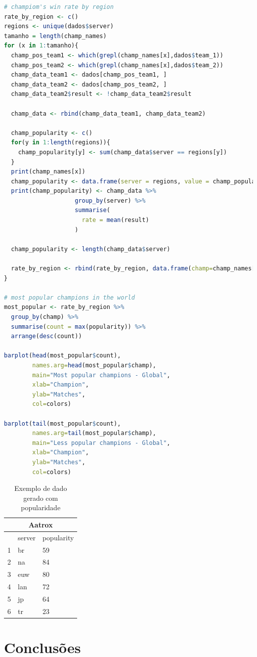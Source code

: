 \documentclass[a4paper]{article}
\begin{document}
\begin{lstlisting}[language=R, caption={Organizando dados com os nomes dos personagens},label={cod:mostpop}]
# champiom's win rate by region
rate_by_region <- c()
regions <- unique(dados$server)
tamanho = length(champ_names)
for (x in 1:tamanho){
  champ_pos_team1 <- which(grepl(champ_names[x],dados$team_1))
  champ_pos_team2 <- which(grepl(champ_names[x],dados$team_2))
  champ_data_team1 <- dados[champ_pos_team1, ]
  champ_data_team2 <- dados[champ_pos_team2, ]
  champ_data_team2$result <- !champ_data_team2$result
  
  champ_data <- rbind(champ_data_team1, champ_data_team2)
  
  champ_popularity <- c()
  for(y in 1:length(regions)){
    champ_popularity[y] <- sum(champ_data$server == regions[y])
  }
  print(champ_names[x])
  champ_popularity <- data.frame(server = regions, value = champ_popularity)
  print(champ_popularity) <- champ_data %>%
                    group_by(server) %>%
                    summarise(
                      rate = mean(result)
                    )
  
  champ_popularity <- length(champ_data$server)
  
  rate_by_region <- rbind(rate_by_region, data.frame(champ=champ_names[x], champ_rate_by_region, popularity = champ_popularity))
}

# most popular champions in the world
most_popular <- rate_by_region %>%
  group_by(champ) %>%
  summarise(count = max(popularity)) %>%
  arrange(desc(count))
  
barplot(head(most_popular$count), 
        names.arg=head(most_popular$champ), 
        main="Most popular champions - Global",
        xlab="Champion",
        ylab="Matches",
        col=colors)

barplot(tail(most_popular$count), 
        names.arg=tail(most_popular$champ), 
        main="Less popular champions - Global",
        xlab="Champion",
        ylab="Matches",
        col=colors)
\end{lstlisting}

\begin{table}[ht]
\centering
\caption{Exemplo de dado gerado com popularidade}
\begin{tabular}{|l|l|l|}
\hline
\multicolumn{3}{|c|}{Aatrox} \\ \hline
 & server & popularity \\ \hline
1 & br & 59 \\ \hline
2 & na & 84 \\ \hline
3 & euw & 80 \\ \hline
4 & lan & 72 \\ \hline
5 & jp & 64 \\ \hline
6 & tr & 23 \\ \hline
\end{tabular}
\end{table}

\section{Conclusões}




\end{document}

